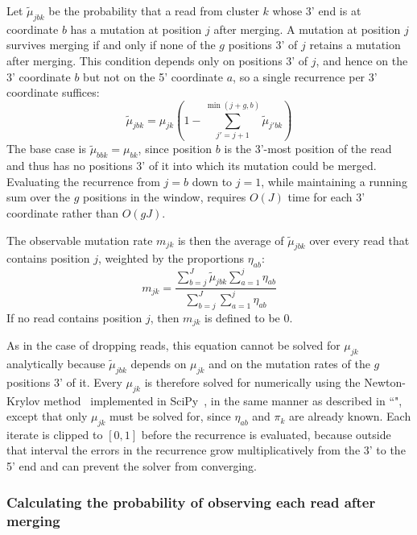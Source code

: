 \documentclass{article}
\begin{document}
Let $\tilde{\mu}_{jbk}$ be the probability that a read from cluster $k$ whose 3' end is at coordinate $b$ has a mutation at position $j$ after merging.
A mutation at position $j$ survives merging if and only if none of the $g$ positions 3' of $j$ retains a mutation after merging.
This condition depends only on positions 3' of $j$, and hence on the 3' coordinate $b$ but not on the 5' coordinate $a$, so a single recurrence per 3' coordinate suffices:
\begin{equation}
    \tilde{\mu}_{jbk} = \mu_{jk}\left(1 - \sum_{j'=j+1}^{\min(j+g, b)}{\tilde{\mu}_{j'bk}}\right)
\end{equation}
The base case is $\tilde{\mu}_{bbk} = \mu_{bk}$, since position $b$ is the 3'-most position of the read and thus has no positions 3' of it into which its mutation could be merged.
Evaluating the recurrence from $j = b$ down to $j = 1$, while maintaining a running sum over the $g$ positions in the window, requires $O(J)$ time for each 3' coordinate rather than $O(gJ)$.

The observable mutation rate $m_{jk}$ is then the average of $\tilde{\mu}_{jbk}$ over every read that contains position $j$, weighted by the proportions $\eta_{ab}$:
\begin{equation}
    m_{jk} = \frac{\sum_{b=j}^{J}{\tilde{\mu}_{jbk} \sum_{a=1}^{j}{\eta_{ab}}}}{\sum_{b=j}^{J}\sum_{a=1}^{j}{\eta_{ab}}}
\end{equation}
If no read contains position $j$, then $m_{jk}$ is defined to be 0.

As in the case of dropping reads, this equation cannot be solved for $\mu_{jk}$ analytically because $\tilde{\mu}_{jbk}$ depends on $\mu_{jk}$ and on the mutation rates of the $g$ positions 3' of it.
Every $\mu_{jk}$ is therefore solved for numerically using the Newton-Krylov method~\cite{Knoll2004} implemented in SciPy~\cite{Virtanen2020}, in the same manner as described in ``", except that only $\mu_{jk}$ must be solved for, since $\eta_{ab}$ and $\pi_k$ are already known.
Each iterate is clipped to $[0, 1]$ before the recurrence is evaluated, because outside that interval the errors in the recurrence grow multiplicatively from the 3' to the 5' end and can prevent the solver from converging.

\subsubsection{Calculating the probability of observing each read after merging}
\label{calc-read-probability-merged}
\end{document}

